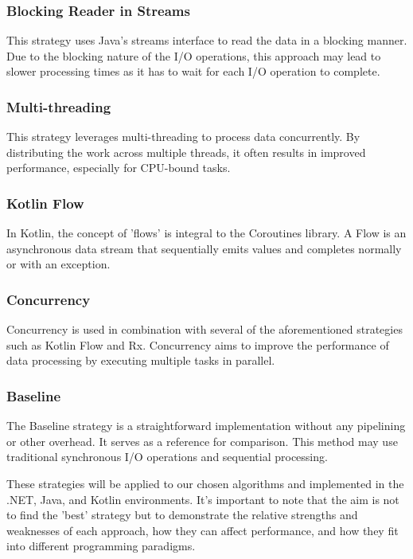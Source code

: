 \subsubsection{Blocking Reader in Streams}
\label{subsubsec:blocking_reader_streams}
This strategy uses Java's streams interface to read the data in a blocking manner. Due to the blocking nature of the I/O operations, this approach may lead to slower processing times as it has to wait for each I/O operation to complete.

\subsubsection{Multi-threading}
\label{subsubsec:multithread}
This strategy leverages multi-threading to process data concurrently. By distributing the work across multiple threads, it often results in improved performance, especially for CPU-bound tasks.

\subsubsection{Kotlin Flow}
\label{subsubsec:kotlin_flow}
In Kotlin, the concept of 'flows' is integral to the Coroutines library. A Flow is an asynchronous data stream that sequentially emits values and completes normally or with an exception.

\subsubsection{Concurrency}
\label{subsubsec:concurrency}
Concurrency is used in combination with several of the aforementioned strategies such as Kotlin Flow and Rx. Concurrency aims to improve the performance of data processing by executing multiple tasks in parallel.

\subsubsection{Baseline}
\label{subsubsec:baseline}
The Baseline strategy is a straightforward implementation without any pipelining or other overhead. It serves as a reference for comparison. This method may use traditional synchronous I/O operations and sequential processing.

These strategies will be applied to our chosen algorithms and implemented in the .NET, Java, and Kotlin environments. It's important to note that the aim is not to find the 'best' strategy but to demonstrate the relative strengths and weaknesses of each approach, how they can affect performance, and how they fit into different programming paradigms.



